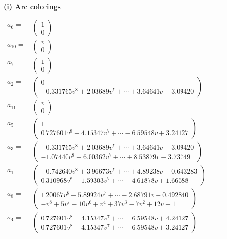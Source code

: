 \documentclass[1p]{elsarticle_modified}
\theoremstyle{definition}
\begin{document}
\flushleft \textbf{(i) Arc colorings}\\
\begin{tabular}{m{7pt} m{180pt} m{7pt} m{180pt} }
\flushright $a_{6}=$&$\begin{pmatrix}1\\0\end{pmatrix}$ \\
\flushright $a_{10}=$&$\begin{pmatrix}v\\0\end{pmatrix}$ \\
\flushright $a_{7}=$&$\begin{pmatrix}1\\0\end{pmatrix}$ \\
\flushright $a_{2}=$&$\begin{pmatrix}0\\-0.331765 v^{8}+2.03689 v^{7}+\cdots+3.64641 v-3.09420\end{pmatrix}$ \\
\flushright $a_{11}=$&$\begin{pmatrix}v\\0\end{pmatrix}$ \\
\flushright $a_{5}=$&$\begin{pmatrix}1\\0.727601 v^{8}-4.15347 v^{7}+\cdots-6.59548 v+3.24127\end{pmatrix}$ \\
\flushright $a_{3}=$&$\begin{pmatrix}-0.331765 v^{8}+2.03689 v^{7}+\cdots+3.64641 v-3.09420\\-1.07440 v^{8}+6.00362 v^{7}+\cdots+8.53879 v-3.73749\end{pmatrix}$ \\
\flushright $a_{1}=$&$\begin{pmatrix}-0.742640 v^{8}+3.96673 v^{7}+\cdots+4.89238 v-0.643283\\0.310968 v^{8}-1.59303 v^{7}+\cdots-4.61878 v+1.66588\end{pmatrix}$ \\
\flushright $a_{8}=$&$\begin{pmatrix}1.20067 v^{8}-5.89924 v^{7}+\cdots-2.68791 v-0.492840\\- v^8+5 v^7-10 v^6+v^4+37 v^3-7 v^2+12 v-1\end{pmatrix}$ \\
\flushright $a_{4}=$&$\begin{pmatrix}0.727601 v^{8}-4.15347 v^{7}+\cdots-6.59548 v+4.24127\\0.727601 v^{8}-4.15347 v^{7}+\cdots-6.59548 v+3.24127\end{pmatrix}$ \\

\end{tabular}
\end{document}

